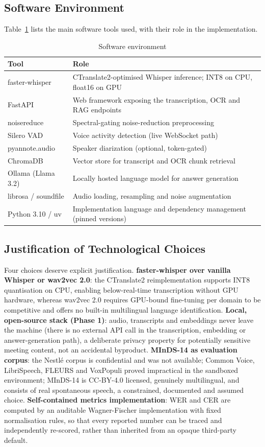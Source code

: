 \documentclass[12pt]{report}
\begin{document}
\subsection{Software Environment}
Table~\ref{tab:software} lists the main software tools used, with their role in the implementation.
\begin{table}[H]
\centering
\small
\begin{tabular}{|l|p{9.5cm}|}
\hline
\textbf{Tool} & \textbf{Role} \\ \hline
faster-whisper & CTranslate2-optimised Whisper inference; INT8 on CPU, float16 on GPU \\ \hline
FastAPI & Web framework exposing the transcription, OCR and RAG endpoints \\ \hline
noisereduce & Spectral-gating noise-reduction preprocessing \\ \hline
Silero VAD & Voice activity detection (live WebSocket path) \\ \hline
pyannote.audio & Speaker diarization (optional, token-gated) \\ \hline
ChromaDB & Vector store for transcript and OCR chunk retrieval \\ \hline
Ollama (Llama 3.2) & Locally hosted language model for answer generation \\ \hline
librosa / soundfile & Audio loading, resampling and noise augmentation \\ \hline
Python 3.10 / uv & Implementation language and dependency management (pinned versions) \\ \hline
\end{tabular}
\caption{Software environment}
\label{tab:software}
\end{table}
\subsection{Justification of Technological Choices}
Four choices deserve explicit justification. \textbf{faster-whisper over vanilla Whisper or wav2vec 2.0}: the CTranslate2 reimplementation supports INT8 quantisation on CPU, enabling below-real-time transcription without GPU hardware, whereas wav2vec 2.0 requires GPU-bound fine-tuning per domain to be competitive and offers no built-in multilingual language identification. \textbf{Local, open-source stack (Phase 1)}: audio, transcripts and embeddings never leave the machine (there is no external API call in the transcription, embedding or answer-generation path), a deliberate privacy property for potentially sensitive meeting content, not an accidental byproduct. \textbf{MInDS-14 as evaluation corpus}: the Nestl\'e corpus is confidential and was not available; Common Voice, LibriSpeech, FLEURS and VoxPopuli proved impractical in the sandboxed environment; MInDS-14 is CC-BY-4.0 licensed, genuinely multilingual, and consists of real spontaneous speech, a constrained, documented and assumed choice. \textbf{Self-contained metrics implementation}: WER and CER are computed by an auditable Wagner-Fischer implementation with fixed normalisation rules, so that every reported number can be traced and independently re-scored, rather than inherited from an opaque third-party default.
\end{document}
